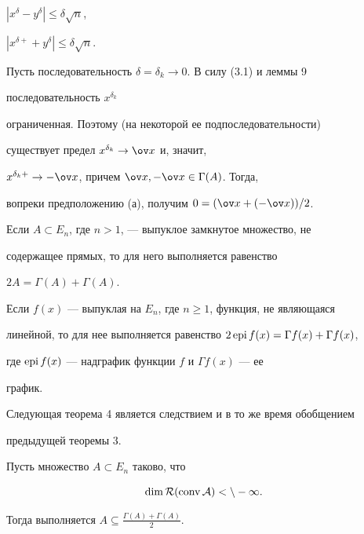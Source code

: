 \begin{pf}
$|x^\delta-y^\delta|\le\delta\sqrt{n}$, 


$|x^{\delta+}+y^\delta|\le\delta\sqrt{n}$. 


 


Пусть последовательность $\delta=\delta_k\to0$. В силу (3.1) и леммы 9 


последовательность $x^{\delta_k}$ 


ограниченная. Поэтому (на некоторой ее подпоследовательности) 


существует предел $x^{\delta_k}\to\ov x$ и, значит, 


$x^{\delta_k+}\to-\ov x$, причем $\ov x,-\ov x\in\Gamma(A)$. Тогда, 


вопреки предположению (а), получим $0=(\ov x+(-\ov x))/2$. 


\end{pf} 


 


\begin{cor} 


Если $A\subset E_n$, где $n>1$, --- выпуклое замкнутое множество, не 


содержащее прямых, то для него выполняется равенство 


$2A=\Gamma(A)+\Gamma(A)$. 


\end{cor} 


 


\begin{cor} 


Если $f(x)$ --- выпуклая на $E_n$, где $n\ge1$, функция, не являющаяся 


линейной, то для нее выполняется равенство $2\epi f(x)=\Gamma 


f(x)+\Gamma f(x)$, 


где $\operatorname{epi} f(x)$ --- надграфик функции $f$ и $\Gamma f(x)$ --- ее 


график. 


\end{cor} 


 


Следующая теорема 4 является следствием и в то же время обобщением 


предыдущей теоремы 3. 


 


\begin{thm} 


Пусть множество $A\subset E_n$ таково, что 


\begin{equation} 


\dim\cal R(\conv A)<n-1. 


\end{equation} 


Тогда выполняется $A\subseteq\frac{\Gamma(A)+\Gamma(A)}{2}$. 


\end{thm} 


